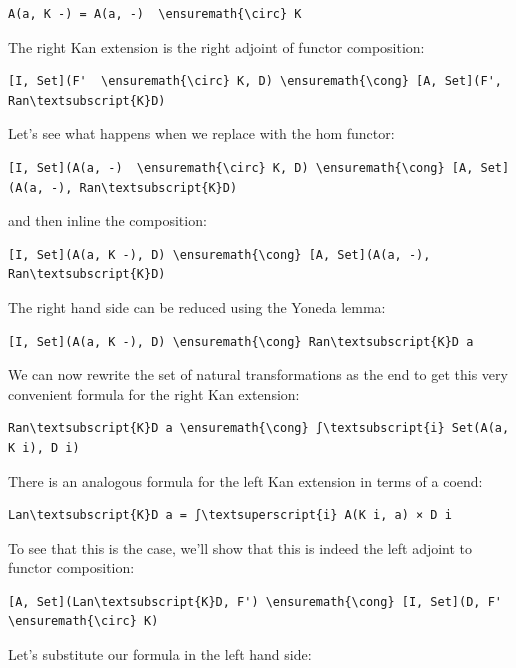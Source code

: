 \begin{Verbatim}[commandchars=\\\{\}]
A(a, K -) = A(a, -)  \ensuremath{\circ} K
\end{Verbatim}
The right Kan extension is the right adjoint of functor composition:

\begin{Verbatim}[commandchars=\\\{\}]
[I, Set](F'  \ensuremath{\circ} K, D) \ensuremath{\cong} [A, Set](F', Ran\textsubscript{K}D)
\end{Verbatim}
Let's see what happens when we replace  with the hom
functor:

\begin{Verbatim}[commandchars=\\\{\}]
[I, Set](A(a, -)  \ensuremath{\circ} K, D) \ensuremath{\cong} [A, Set](A(a, -), Ran\textsubscript{K}D)
\end{Verbatim}
and then inline the composition:

\begin{Verbatim}[commandchars=\\\{\}]
[I, Set](A(a, K -), D) \ensuremath{\cong} [A, Set](A(a, -), Ran\textsubscript{K}D)
\end{Verbatim}
The right hand side can be reduced using the Yoneda lemma:

\begin{Verbatim}[commandchars=\\\{\}]
[I, Set](A(a, K -), D) \ensuremath{\cong} Ran\textsubscript{K}D a
\end{Verbatim}
We can now rewrite the set of natural transformations as the end to get
this very convenient formula for the right Kan extension:

\begin{Verbatim}[commandchars=\\\{\}]
Ran\textsubscript{K}D a \ensuremath{\cong} ∫\textsubscript{i} Set(A(a, K i), D i)
\end{Verbatim}
There is an analogous formula for the left Kan extension in terms of a
coend:

\begin{Verbatim}[commandchars=\\\{\}]
Lan\textsubscript{K}D a = ∫\textsuperscript{i} A(K i, a) × D i
\end{Verbatim}
To see that this is the case, we'll show that this is indeed the left
adjoint to functor composition:

\begin{Verbatim}[commandchars=\\\{\}]
[A, Set](Lan\textsubscript{K}D, F') \ensuremath{\cong} [I, Set](D, F' \ensuremath{\circ} K)
\end{Verbatim}
Let's substitute our formula in the left hand side:

